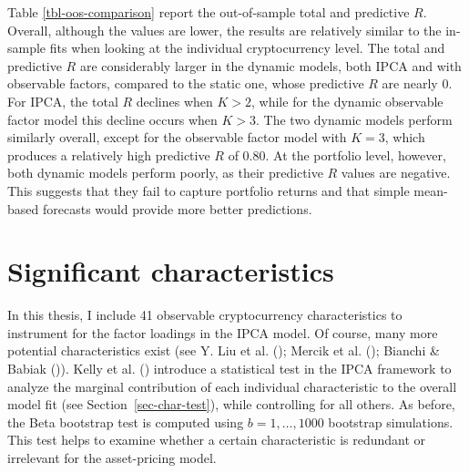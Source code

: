 \documentclass[
  12pt,
  a4paper,
  openany]{scrbook}
\begin{document}
Table \ref{tbl-oos-comparison} report the out-of-sample total and
predictive \(R\). Overall, although the values are lower, the results
are relatively similar to the in-sample fits when looking at the
individual cryptocurrency level. The total and predictive \(R\) are
considerably larger in the dynamic models, both IPCA and with observable
factors, compared to the static one, whose predictive \(R\) are nearly
0. For IPCA, the total \(R\) declines when \(K > 2\), while for the
dynamic observable factor model this decline occurs when \(K > 3\). The
two dynamic models perform similarly overall, except for the observable
factor model with \(K=3\), which produces a relatively high predictive
\(R\) of 0.80. At the portfolio level, however, both dynamic models
perform poorly, as their predictive \(R\) values are negative. This
suggests that they fail to capture portfolio returns and that simple
mean-based forecasts would provide more better predictions.

\section{Significant characteristics}\label{significant-characteristics}

In this thesis, I include 41 observable cryptocurrency characteristics
to instrument for the factor loadings in the IPCA model. Of course, many
more potential characteristics exist (see Y. Liu et al.
(); Mercik et al.
();
Bianchi \& Babiak
()). Kelly et
al. () introduce a
statistical test in the IPCA framework to analyze the marginal
contribution of each individual characteristic to the overall model fit
(see Section~\ref{sec-char-test}), while controlling for all others. As
before, the Beta bootstrap test is computed using \(b=1, \dots, 1000\)
bootstrap simulations. This test helps to examine whether a certain
characteristic is redundant or irrelevant for the asset-pricing model.
\end{document}
